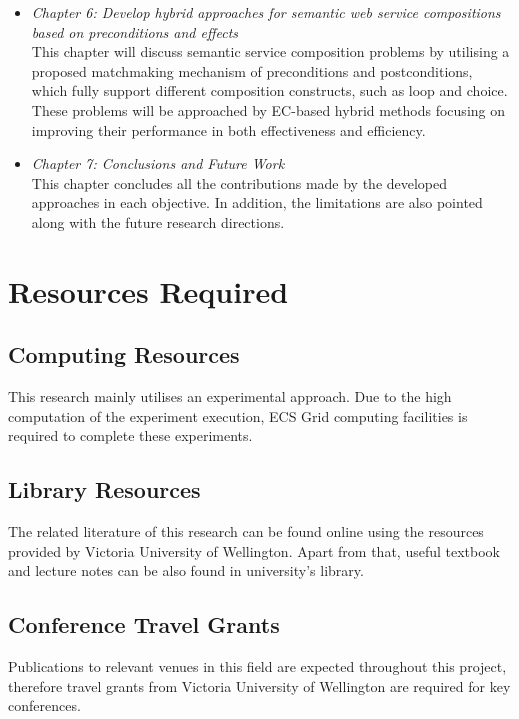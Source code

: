 \begin{itemize}
 \item \textit{Chapter 6: Develop hybrid approaches for semantic web service compositions based on preconditions and effects}\\
This chapter will discuss semantic service composition problems by utilising a proposed matchmaking mechanism of preconditions and postconditions, which fully support different composition constructs, such as loop and choice. These problems will be approached by EC-based hybrid methods focusing on improving their performance in both effectiveness and efficiency.
 \item \textit{Chapter 7: Conclusions and Future Work}\\
This chapter concludes all the contributions made by the developed approaches in each objective. In addition, the limitations are also pointed along with the future research directions.
\end{itemize}


\section{Resources Required}

\subsection{Computing Resources}
This research mainly utilises an experimental approach. Due to the high computation of the experiment execution, ECS Grid computing facilities is required to complete these experiments.

\subsection{Library Resources}
The related literature of this research can be found online using the resources provided by Victoria University of Wellington. Apart from that, useful textbook and lecture notes can be also found in university's library.

\subsection{Conference Travel Grants}
Publications to relevant venues in this field are expected throughout this project, therefore travel grants from Victoria University of Wellington are required for key conferences.